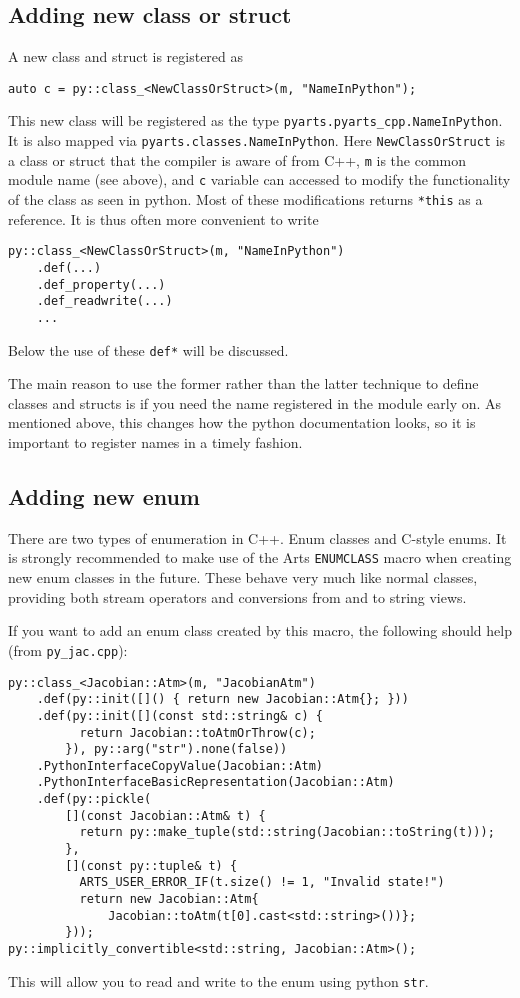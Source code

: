 \subsection{Adding new class or struct \label{subsec: new class}}
A new class and struct is registered as
\begin{verbatim}
auto c = py::class_<NewClassOrStruct>(m, "NameInPython");
\end{verbatim}

This new class will be registered as the type \verb|pyarts.pyarts_cpp.NameInPython|.  It is also mapped via \verb|pyarts.classes.NameInPython|.
Here \verb|NewClassOrStruct| is a class or struct that the compiler is aware of from C++, \verb|m| is the common module name (see above), and
\verb|c| variable can accessed to modify the functionality of the class as seen in python.  Most of these modifications returns \verb|*this| as 
a reference.  It is thus often more convenient to write
\begin{verbatim}
py::class_<NewClassOrStruct>(m, "NameInPython")
    .def(...)
    .def_property(...)
    .def_readwrite(...)
    ...
\end{verbatim}
Below the use of these \verb|def*| will be discussed.

The main reason to use the former rather than the latter technique to define classes and structs is if you need the name
registered in the module early on.  As mentioned above, this changes how the python documentation looks, so it is important
to register names in a timely fashion.

\subsection{Adding new enum}
There are two types of enumeration in C++.  Enum classes and C-style enums.  It is strongly recommended to make use of the
Arts \verb|ENUMCLASS| macro when creating new enum classes in the future.  These behave very much like normal classes,
providing both stream operators and conversions from and to string views.

If you want to add an enum class created by this macro, the following
should help (from \verb|py_jac.cpp|):
\begin{verbatim}
py::class_<Jacobian::Atm>(m, "JacobianAtm")
    .def(py::init([]() { return new Jacobian::Atm{}; }))
    .def(py::init([](const std::string& c) { 
          return Jacobian::toAtmOrThrow(c); 
        }), py::arg("str").none(false))
    .PythonInterfaceCopyValue(Jacobian::Atm)
    .PythonInterfaceBasicRepresentation(Jacobian::Atm)
    .def(py::pickle(
        [](const Jacobian::Atm& t) {
          return py::make_tuple(std::string(Jacobian::toString(t)));
        },
        [](const py::tuple& t) {
          ARTS_USER_ERROR_IF(t.size() != 1, "Invalid state!")
          return new Jacobian::Atm{
              Jacobian::toAtm(t[0].cast<std::string>())};
        }));
py::implicitly_convertible<std::string, Jacobian::Atm>();
\end{verbatim}
This will allow you to read and write to the enum using python \verb|str|.

